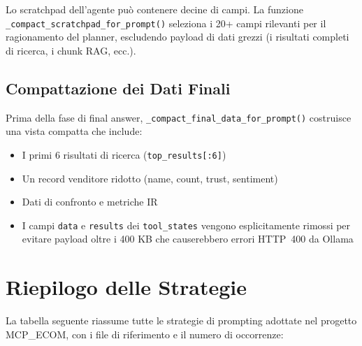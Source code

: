 Lo scratchpad dell'agente può contenere decine di campi. La funzione
\texttt{\_compact\_scratchpad\_for\_prompt()} seleziona i 20+ campi
rilevanti per il ragionamento del planner, escludendo payload di dati
grezzi (i risultati completi di ricerca, i chunk RAG, ecc.).

\subsection{Compattazione dei Dati Finali}
\label{subsec:compact-final-data}

Prima della fase di final answer, \texttt{\_compact\_final\_data\_for\_prompt()}
costruisce una vista compatta che include:

\begin{itemize}
    \item I primi 6 risultati di ricerca (\texttt{top\_results[:6]})
    \item Un record venditore ridotto (name, count, trust, sentiment)
    \item Dati di confronto e metriche IR
    \item I campi \texttt{data} e \texttt{results} dei \texttt{tool\_states}
          vengono esplicitamente rimossi per evitare payload oltre i 400 KB
          che causerebbero errori HTTP~400 da Ollama
\end{itemize}


\section{Riepilogo delle Strategie}
\label{sec:prompt-summary}

La tabella seguente riassume tutte le strategie di prompting adottate
nel progetto MCP\_ECOM, con i file di riferimento e il numero di
occorrenze:

